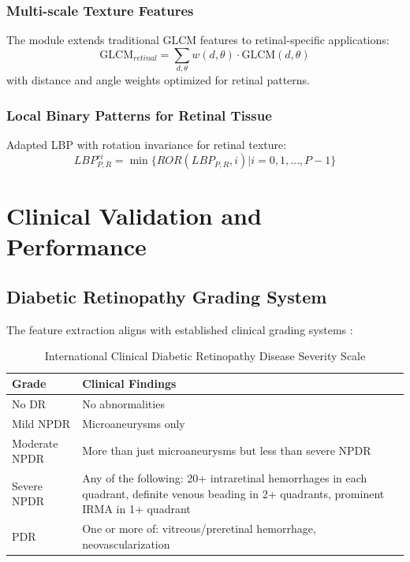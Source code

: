 \documentclass[12pt,a4paper]{article}
\begin{document}
\subsubsection{Multi-scale Texture Features}
The module extends traditional GLCM features \cite{haralick1973texture} to retinal-specific applications:
\begin{equation}
\text{GLCM}_{retinal} = \sum_{d,\theta} w(d,\theta) \cdot \text{GLCM}(d,\theta)
\end{equation}
with distance and angle weights optimized for retinal patterns.

\subsubsection{Local Binary Patterns for Retinal Tissue}
Adapted LBP \cite{ojala2002multiresolution} with rotation invariance for retinal texture:
\begin{equation}
LBP_{P,R}^{ri} = \min\{ROR(LBP_{P,R}, i) | i = 0,1,\dots,P-1\}
\end{equation}

\section{Clinical Validation and Performance}

\subsection{Diabetic Retinopathy Grading System}

The feature extraction aligns with established clinical grading systems \cite{wilkinson2003proposed}:

\begin{table}[h!]
\centering
\caption{International Clinical Diabetic Retinopathy Disease Severity Scale}
\label{tab:dr_grading}
\begin{tabular}{@{}lp{8cm}@{}}
\toprule
\textbf{Grade} & \textbf{Clinical Findings} \\
\midrule
No DR & No abnormalities \\
Mild NPDR & Microaneurysms only \\
Moderate NPDR & More than just microaneurysms but less than severe NPDR \\
Severe NPDR & Any of the following: 20+ intraretinal hemorrhages in each quadrant, definite venous beading in 2+ quadrants, prominent IRMA in 1+ quadrant \\
PDR & One or more of: vitreous/preretinal hemorrhage, neovascularization \\
\bottomrule
\end{tabular}
\end{table}
\end{document}
